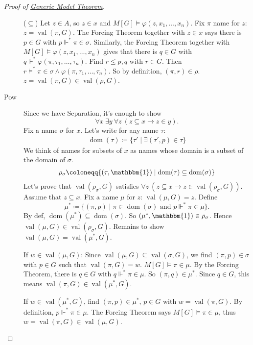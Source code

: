 \documentclass{article}
\newcommand{\1}{\mathbbm{1}}
\DeclareMathOperator{\dom}{dom}
\DeclareMathOperator{\val}{val}
\let\models\vDash
\let\forces\Vdash
\begin{document}
\begin{proof}[Proof of \hyperlink{thm:genericmodel}{Generic Model Theorem}]
\begin{description}
      ($\subseteq$) Let $z \in A$, so $z \in x$ and $M[G] \models \varphi(z, x_1, \dotsc, x_n)$. Fix $\pi$ name for $z$: $z=\val(\pi,G)$.
      The Forcing Theorem together with $z \in x$ says there is $p \in G$  with $p \forces^* \pi \in \sigma$.
      Similarly, the Forcing Theorem together with $M[G] \models \varphi(z, x_1, \dotsc, x_n)$ gives that there is $q \in G$ with $q \forces^* \varphi(\pi, \tau_1, \dotsc, \tau_n)$.
      Find $r \leq p,q$ with $r \in G$.
      Then $r \models^* \pi \in \sigma \land \varphi(\pi, \tau_1, \dotsc, \tau_n)$. So by definition, $(\pi,r) \in \rho$.
      $z = \val(\pi,G) \in \val(\rho,G)$.
    \item[\textsf{Pow}] Since we have Separation, it's enough to show
      \begin{equation*}
        \forall x\ \exists y\ \forall z\ (z \subseteq x \rightarrow z \in y).
      \end{equation*}
      Fix a name $\sigma$ for $x$. Let's write for any name $\tau$:
      \begin{align*}
        \dom(\tau) \coloneqq \{\tau' \mid \exists (\tau',p) \in \tau\}
      \end{align*}
      We think of names for subsets of $x$ as names whose domain is a subset of the domain of $\sigma$.
      \begin{align*}
        \rho_\sigma \coloneqq \{(\tau,\1) \mid \dom(\tau) \subseteq \dom(\sigma)\}
      \end{align*}
      Let's prove that $\val(\rho_\sigma,G)$ satisfies $\forall z \ (z \subseteq x \rightarrow z \in \val(\rho_\sigma,G))$.
      Assume that $z \subseteq x$. Fix a name $\mu$ for $z$: $\val(\mu,G) = z$.
      Define
      \begin{equation*}
        \mu^* \coloneqq \{(\pi,p) \mid \pi \in \dom(\sigma) \text{ and } p \forces^* \pi \in \mu\}.
      \end{equation*}
      By def, $\dom(\mu^*) \subseteq \dom(\sigma)$. So $(\mu^*,\1) \in \rho_\sigma$. Hence $\val(\mu,G) \in \val(\rho_\sigma,G)$.
      Remains to show $\val(\mu,G) = \val(\mu^*,G)$.

      If $w \in \val(\mu,G)$: Since $\val(\mu,G) \subseteq \val(\sigma,G)$, we find $(\pi,p) \in \sigma$ with $p \in G$ such that $\val(\pi,G) = w$.
      $M[G] \models \pi \in \mu$. By the Forcing Theorem, there is $q \in G$ with $q \forces^* \pi \in \mu$.
      So $(\pi,q) \in \mu^*$. Since $q \in G$, this means $\val(\pi,G) \in \val(\mu^*,G)$.

      If $w \in \val(\mu^*,G)$, find $(\pi,p) \in \mu^*$, $p \in G$ with $w = \val(\pi,G)$. By definition, $p \forces^* \pi \in \mu$.
      The Forcing Theorem says $M[G] \models \pi \in \mu$, thus $w = \val(\pi,G) \in \val(\mu,G)$. \qedhere
  \end{description}
\end{proof}
\end{document}
